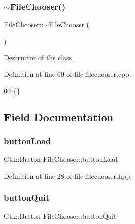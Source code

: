 \mbox{\label{class_file_chooser_a67c94ae24fad94cf464d1283f33175d4}} 
\subsubsection{\texorpdfstring{$\sim$\+File\+Chooser()}{~FileChooser()}}
{\footnotesize\ttfamily File\+Chooser\+::$\sim$\+File\+Chooser (\begin{DoxyParamCaption}{ }\end{DoxyParamCaption})\hspace{0.3cm}{\ttfamily [virtual]}}



Destructor of the class. 



Definition at line 60 of file filechooser.\+cpp.


\begin{DoxyCode}
60 \{\}
\end{DoxyCode}


\subsection{Field Documentation}
\mbox{\label{class_file_chooser_a8a482acec202e153b7764e7942d1895b}} 
\subsubsection{\texorpdfstring{button\+Load}{buttonLoad}}
{\footnotesize\ttfamily Gtk\+::\+Button File\+Chooser\+::button\+Load\hspace{0.3cm}{\ttfamily [protected]}}



Definition at line 28 of file filechooser.\+hpp.

\mbox{\label{class_file_chooser_ac7ff53b66e963e4478cecea22de7331c}} 
\subsubsection{\texorpdfstring{button\+Quit}{buttonQuit}}
{\footnotesize\ttfamily Gtk\+::\+Button File\+Chooser\+::button\+Quit\hspace{0.3cm}{\ttfamily [protected]}}



